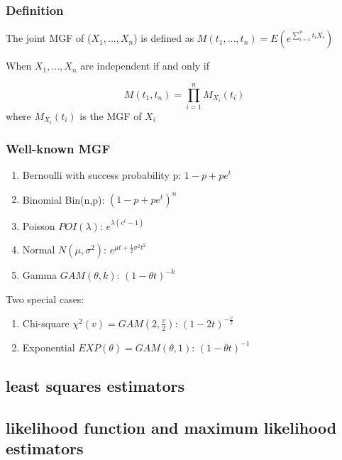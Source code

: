 \documentclass[
]{book}
\begin{document}
\hypertarget{definition}{%
\subsubsection{Definition}\label{definition}}

The joint MGF of (\(X_1, ..., X_n\)) is defined as \(M(t_1,...,t_n)=E(e^{\sum_{i=1}^nt_iX_i})\)

When \(X_1, ..., X_n\) are independent if and only if

\[M(t_1,t_n)=\prod_{i=1}^n M_{X_i}(t_i)\]
where \(M_{X_i}(t_i)\) is the MGF of \(X_i\)

\hypertarget{well-known-mgf}{%
\subsubsection{Well-known MGF}\label{well-known-mgf}}

\begin{enumerate}
\def\labelenumi{(\arabic{enumi})}
\item
  Bernoulli with success probability p: \(1-p+pe^t\)
\item
  Binomial Bin(n,p): \((1-p+pe^t)^n\)
\item
  Poisson \(POI(\lambda)\): \(e^{\lambda(e^t-1)}\)
\item
  Normal \(N(\mu,\sigma^2)\): \(e^{\mu t+\frac{1}{2}\sigma^2t^2}\)
\item
  Gamma \(GAM(\theta,k)\): \((1-\theta t)^{-k}\)
\end{enumerate}

Two special cases:

\begin{enumerate}
\def\labelenumi{(\arabic{enumi})}
\setcounter{enumi}{5}
\item
  Chi-square \(\chi^2(v) =GAM(2,\frac{v}{2})\): \((1-2t)^{-\frac{v}{2}}\)
\item
  Exponential \(EXP(\theta)=GAM(\theta,1)\): \((1-\theta t)^{-1}\)
\end{enumerate}

\hypertarget{least-squares-estimators}{%
\subsection{least squares estimators}\label{least-squares-estimators}}

\hypertarget{likelihood-function-and-maximum-likelihood-estimators}{%
\subsection{likelihood function and maximum likelihood estimators}\label{likelihood-function-and-maximum-likelihood-estimators}}
\end{document}
